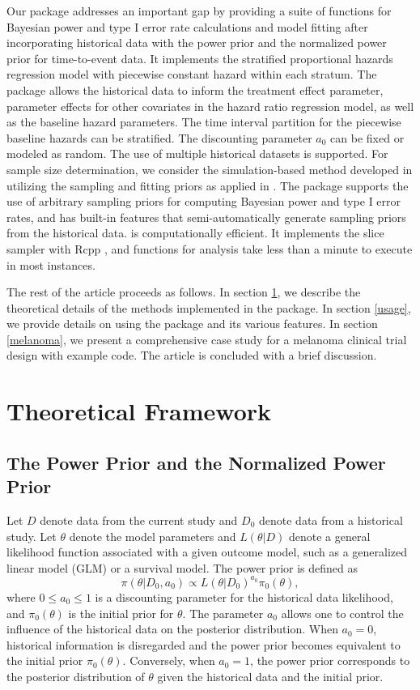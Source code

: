 Our package  \citep{BayesPPDSurv} addresses an important gap by providing a suite of functions for Bayesian power and type I error rate calculations and model fitting after incorporating historical data with the power prior and the normalized power prior for time-to-event data. It implements the stratified proportional hazards regression model with piecewise constant hazard within each stratum. The package allows the historical data to inform the treatment effect parameter, parameter effects for other covariates in the hazard ratio regression model, as well as the baseline hazard parameters. The time interval partition for the piecewise baseline hazards can be stratified. The discounting parameter $a_0$ can be fixed or modeled as random. The use of multiple historical datasets is supported. For sample size determination, we consider the simulation-based method developed in \cite{Chen_2011} utilizing the sampling and fitting priors \citep{Gelfand_2002} as applied in \cite{Psioda_Ibrahim_2019}. The package supports the use of arbitrary sampling priors for computing Bayesian power and type I error rates, and has built-in features that semi-automatically generate sampling priors from the historical data.  is computationally efficient. It implements the slice sampler \citep{slice} with Rcpp \citep{Rcpp}, and functions for analysis take less than a minute to execute in most instances.

The rest of the article proceeds as follows. In section \ref{sec2}, we describe the theoretical details of the methods implemented in the package. In section \ref{usage}, we provide details on using the package and its various features. In section \ref{melanoma}, we present a comprehensive case study for a melanoma clinical trial design with example code. The article is concluded with a brief discussion.

\section{Theoretical Framework}
\label{sec2}
\subsection{The Power Prior and the Normalized Power Prior}

Let $D$ denote data from the current study and $D_0$ denote data from a historical study. Let $\theta$ denote the model parameters and $L(\theta|D)$ denote a general likelihood function associated with a given outcome model, such as a generalized linear model (GLM) or a survival model. The power prior \citep{ibrahim_2000} is defined as $$\pi(\theta|D_0, a_0) \propto L(\theta|D_0)^{a_0}\pi_0(\theta),$$ where $0 \le a_0 \le 1$ is a discounting parameter for the historical data likelihood, and $\pi_0(\theta)$ is the initial prior for $\theta$. The parameter $a_0$ allows one to control the influence of the historical data on the posterior distribution. When $a_0=0$, historical information is disregarded and the power prior becomes equivalent to the initial prior $\pi_0(\theta)$. Conversely, when $a_0=1$, the power prior corresponds to the posterior distribution of $\theta$ given the historical data and the initial prior.    

